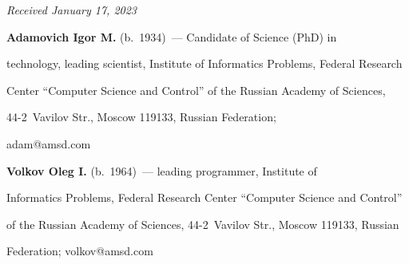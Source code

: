 \vspace*{-4pt}





\hfill{\small\textit{Received January 17, 2023}} 





\vspace*{-12pt} 


  


  \Contr


  


  \noindent


  \textbf{Adamovich Igor M.} (b.\ 1934)~--- Candidate of Science (PhD) in 


technology, leading scientist, Institute of Informatics Problems, Federal Research 


Center ``Computer Science and Control'' of the Russian Academy of Sciences,  


44-2~Vavilov Str., Moscow 119133, Russian Federation; 


\mbox{adam@amsd.com}


   


   \vspace*{3pt}


   


   \noindent


   \textbf{Volkov Oleg I.} (b.\ 1964)~--- leading programmer, Institute of 


Informatics Problems, Federal Research Center ``Computer Science and Control'' 


of the Russian Academy of Sciences, 44-2~Vavilov Str., Moscow 119133, Russian 


Federation; \mbox{volkov@amsd.com}





  


\label{end\stat}





\renewcommand{\bibname}{\protect\rm Литература}    


   


